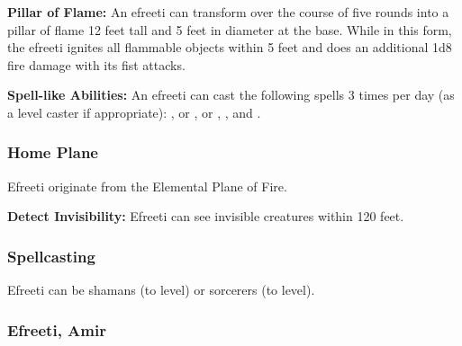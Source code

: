 \begin{multicols*}{2}
\textbf{Pillar of Flame:} An efreeti can transform over the course of five rounds into a pillar of flame 12 feet tall and 5 feet in diameter at the base. While in this form, the efreeti ignites all flammable objects within 5 feet and does an additional 1d8 fire damage with its fist attacks.

\textbf{Spell-like Abilities:} An efreeti can cast the following spells 3 times per day (as a  level caster if appropriate): ,  or ,  or , , and .

\subsubsection{Home Plane}
Efreeti originate from the Elemental Plane of Fire.

\textbf{Detect Invisibility:} Efreeti can see invisible creatures within 120 feet.

\subsubsection{Spellcasting}
Efreeti can be shamans (to  level) or sorcerers (to  level).

\subsubsection{Efreeti, Amir}
\end{multicols*}
